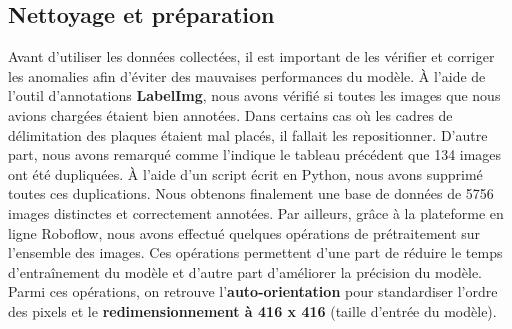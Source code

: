     \subsection{Nettoyage et préparation}
    Avant d’utiliser les données collectées, il est important de les vérifier et corriger les anomalies afin d’éviter des mauvaises performances du modèle. À l’aide de l’outil d’annotations \textbf{LabelImg}, nous avons vérifié si toutes les images que nous avions chargées étaient bien annotées. Dans certains cas où les cadres de délimitation des plaques étaient mal placés, il fallait les repositionner. D’autre part, nous avons remarqué comme l’indique le tableau précédent que 134 images ont été dupliquées. À l’aide d’un script écrit en Python, nous avons supprimé toutes ces duplications. Nous obtenons finalement une base de données de 5756 images distinctes et correctement annotées. Par ailleurs, grâce à la plateforme en ligne Roboflow, nous avons effectué quelques opérations de prétraitement sur l’ensemble des images. Ces opérations permettent d’une part de réduire le temps d’entraînement du modèle et d’autre part d'améliorer la précision du modèle. Parmi ces opérations, on retrouve l’\textbf{auto-orientation} pour standardiser l’ordre des pixels et le \textbf{redimensionnement à 416 x 416} (taille d’entrée du modèle).
